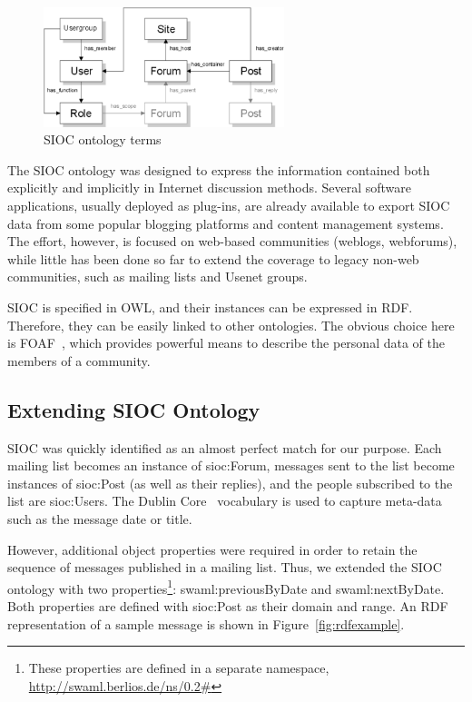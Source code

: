 \documentclass{llncs}
\begin{document}
\begin{figure}[ht]
 \centering
 \includegraphics[width=7cm]{images/sioc-terms.png}
 \caption{SIOC ontology terms}
\end{figure}

The SIOC ontology was designed to express the information contained
both explicitly  and implicitly in Internet discussion methods. Several 
software applications, usually deployed as plug-ins, are already available 
to export SIOC data from some popular blogging platforms and content 
management systems. The effort, however, is focused on web-based communities 
(weblogs, webforums), while little has been done so far to extend the coverage 
to legacy non-web communities, such as mailing lists and Usenet groups.

SIOC is specified in OWL, and their instances can be expressed
in RDF. Therefore, they can be easily linked to other ontologies.
The obvious choice here is FOAF~\cite{FOAF}, which provides
powerful means to describe the personal data of the members of
a community.

\subsection{Extending SIOC Ontology}

SIOC was quickly identified as an almost perfect match for our
purpose. Each mailing list becomes an instance of \textsf{sioc:Forum},
messages sent to the list become instances of \textsf{sioc:Post}
(as well as their replies), and the people subscribed to the
list are \textsf{sioc:User}s. The Dublin Core~\cite{DublinCore}
vocabulary is used to capture meta-data such as the message
date or title.

However, additional object properties were required
in order to retain the sequence of messages published in a
mailing list. Thus, we extended the SIOC ontology with two
properties\footnote{These properties are defined in a separate
namespace, \url{http://swaml.berlios.de/ns/0.2\#}}:
\textsf{swaml:previousByDate} and \textsf{swaml:nextByDate}. Both properties
are defined with \textsf{sioc:Post} as their domain and range.
An RDF representation of a sample message is shown in
Figure~\ref{fig:rdfexample}.
\end{document}
